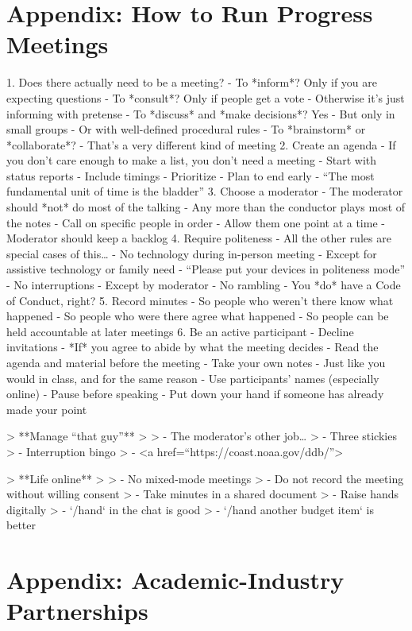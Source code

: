 \documentclass[10pt,letterpaper]{article}
\begin{document}
\section*{Appendix: How to Run Progress Meetings}

1. Does there actually need to be a meeting?
   - To *inform*? Only if you are expecting questions
   - To *consult*? Only if people get a vote
     - Otherwise it's just informing with pretense
   - To *discuss* and *make decisions*? Yes
     - But only in small groups
     - Or with well-defined procedural rules
   - To *brainstorm* or *collaborate*?
     - That's a very different kind of meeting
2. Create an agenda
   - If you don't care enough to make a list, you don't need a meeting
   - Start with status reports
   - Include timings
   - Prioritize
   - Plan to end early
     - ``The most fundamental unit of time is the bladder''
3. Choose a moderator
   - The moderator should *not* do most of the talking
     - Any more than the conductor plays most of the notes
   - Call on specific people in order
   - Allow them one point at a time
   - Moderator should keep a backlog
4. Require politeness
   - All the other rules are special cases of this{\ldots}
   - No technology during in-person meeting
     - Except for assistive technology or family need
     - ``Please put your devices in politeness mode''
   - No interruptions
     - Except by moderator
   - No rambling
   - You *do* have a Code of Conduct, right?
5. Record minutes
   - So people who weren't there know what happened
   - So people who were there agree what happened
   - So people can be held accountable at later meetings
6. Be an active participant
   - Decline invitations
     - *If* you agree to abide by what the meeting decides
   - Read the agenda and material before the meeting
   - Take your own notes
     - Just like you would in class, and for the same reason \cite{Aiken1975,Bohay2011}
   - Use participants' names (especially online)
   - Pause before speaking
   - Put down your hand if someone has already made your point

> **Manage ``that guy''**
>
> - The moderator's other job{\ldots}
> - Three stickies
> - Interruption bingo
> - <a href=``https://coast.noaa.gov/ddb/''>

> **Life online**
>
> - No mixed-mode meetings
> - Do not record the meeting without willing consent
> - Take minutes in a shared document
> - Raise hands digitally
>   - `/hand` in the chat is good
>   - `/hand another budget item` is better

\section*{Appendix: Academic-Industry Partnerships}
\end{document}
